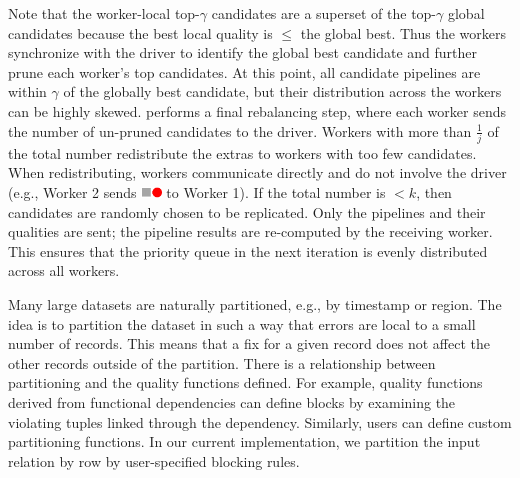 Note that the worker-local top-$\gamma$ candidates are a superset of the top-$\gamma$ global candidates because the best local quality is $\le$ the global best.   Thus the workers synchronize with the driver to identify the global best candidate and further prune each worker's top candidates.  At this point, all candidate pipelines are within $\gamma$ of the globally best candidate, but their distribution across the workers can be highly skewed.  \sys performs a final rebalancing step, where each worker sends the number of un-pruned candidates to the driver.  Workers with more than $\frac{1}{j}$ of the total number redistribute the extras to workers with too few candidates.  When redistributing, workers communicate directly and do not involve the driver (e.g., Worker 2 sends \includegraphics[height=8pt]{figures/program-greyred.pdf} to Worker 1).   If the total number is $<k$, then candidates are randomly chosen to be replicated.  Only the pipelines and their qualities are sent; the pipeline results are re-computed by the receiving worker.  This ensures that the priority queue in the next iteration is evenly distributed across all workers.

Many large datasets are naturally partitioned, e.g., by timestamp or region. 
The idea is to partition the dataset in such a way that errors are local to a small number of records.
This means that a fix for a given record does not affect the other records outside of the partition.
There is a relationship between partitioning and the quality functions defined.
For example, quality functions derived from functional dependencies can define blocks by examining the violating tuples linked through the dependency.  Similarly, users can define custom partitioning functions.  In our current implementation, we partition the input relation by row by user-specified blocking rules.

